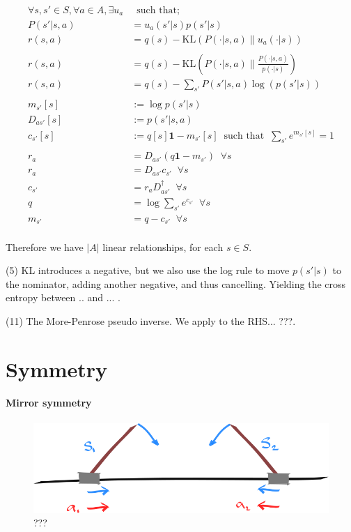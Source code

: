 \begin{align}
\forall s, s' \in S, \forall a \in A, \exists u_a& \;\;\text{such that;} \tag{1}\\
P(s' | s, a) &= u_a(s'|s)p(s'|s) \tag{2}\\
r(s, a) &= q(s) - \text{KL}(P(\cdot | s, a) \parallel u_a(\cdot| s) ) \tag{3}\\
\\
r(s, a) &= q(s) - \text{KL}(P(\cdot | s, a)\parallel\frac{P(\cdot | s, a)}{p(\cdot|s)}) \tag{4}\\
r(s, a) &= q(s) - \sum_{s'}P(s' | s, a) \log(p(s'|s)) \tag{5}\\
\\
m_{s'}[s]&:= \log p(s' | s) \tag{6}\\
D_{as'}[s] &:= p(s'|s, a) \tag{7}\\
c_{s'}[s] &:= q[s] \mathbf 1 - m_{s'}[s] \;\;\text{such that} \;\; \sum_{s'} e^{m_{s'}[s]} = 1 \tag{8}\\
\\
r_a &= D_{as'} ( q \mathbf 1 - m_{s'}) \;\;\forall s \tag{9}\\
r_a &= D_{as'}c_{s'}  \;\;\forall s \tag{10}\\
c_{s'} &= r_aD_{as'}^{\dagger} \;\;\forall s\tag{11}\\
q &= \log \sum_{s'} e^{c_{s'}} \;\;\forall s\tag{12}\\
m_{s'} &= q - c_{s'} \;\;\forall s\tag{14}\\
\end{align}


Therefore we have $|A|$ linear relationships, for each $s\in S$.

(5) KL introduces a negative, but we also use the log rule to move $p(s'|s)$ to the nominator, adding another negative, and thus cancelling. Yielding the cross entropy between .. and ... .

(11) The More-Penrose pseudo inverse. We apply to the RHS... ???.

\section{Symmetry}


\hypertarget{mirror-symmetry}{%
\paragraph{Mirror symmetry}\label{mirror-symmetry}}

\begin{figure}
\centering
\includegraphics[width=1\textwidth,height=0.25\textheight]{../../pictures/drawings/cart-pole-mirror.png}
\caption{???}
\end{figure}

